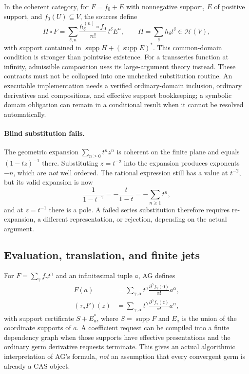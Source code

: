 \documentclass[11pt,letterpaper]{article}
\numberwithin{equation}{section}
\theoremstyle{definition}
\theoremstyle{remark}
\newcommand{\HH}{\mathscr H}
\newcommand{\supp}{\operatorname{supp}}
\begin{document}
In the coherent category, for $F=f_0+E$ with nonnegative support, $E$ of
positive support, and $f_0(U)\subseteq V$, the sources define
\begin{equation}\label{cas:eq-composition}
 H\circ F=\sum_{\delta,n}\frac{h_\delta^{(n)}\circ f_0}{n!}\,t^\delta E^n,
 \qquad H=\sum_\delta h_\delta t^\delta\in\HH(V),
\end{equation}
with support contained in $\supp H+(\supp E)^*$. This common-domain condition is
stronger than pointwise existence. For a transseries function at infinity,
admissible composition uses its large-argument theory instead. These contracts
must not be collapsed into one unchecked substitution routine. An executable
implementation needs a verified ordinary-domain inclusion, ordinary derivatives
and compositions, and effective support bookkeeping; a symbolic domain
obligation can remain in a conditional result when it cannot be resolved
automatically.

\paragraph{Blind substitution fails.}
The geometric expansion $\sum_{n\ge0}t^nz^n$ is coherent on the finite plane and
equals $(1-tz)^{-1}$ there. Substituting $z=t^{-2}$ into the expansion produces
exponents $-n$, which are \emph{not} well ordered. The rational expression still
has a value at $t^{-2}$, but its valid expansion is now
\begin{equation}\label{cas:eq-blindsub}
 \frac1{1-t^{-1}}=-\frac{t}{1-t}=-\sum_{n\ge1}t^n ,
\end{equation}
and at $z=t^{-1}$ there is a pole. A failed series substitution therefore
requires re-expansion, a different representation, or rejection, depending on
the actual argument.

\subsection{Evaluation, translation, and finite jets}
\label{cas:sub-jetsgerms}
For $F=\sum_\gamma f_\gamma t^\gamma$ and an infinitesimal tuple $a$, AG defines
\begin{align}
 F(a)&=\sum_{\gamma,\alpha}t^\gamma
 \frac{\partial^\alpha f_\gamma(0)}{\alpha!}a^\alpha,
 \label{cas:eq-germeval}\\
 (\tau_aF)(z)&=\sum_{\gamma,\alpha}t^\gamma
 \frac{\partial^\alpha f_\gamma(z)}{\alpha!}a^\alpha,
 \label{cas:eq-germtranslation}
\end{align}
with support certificate $S+E_a^*$, where $S=\supp F$ and $E_a$ is the union of
the coordinate supports of $a$. A coefficient request can be compiled into a
finite dependency graph when those supports have effective presentations and the
ordinary germ derivative requests terminate. This gives an actual algorithmic
interpretation of AG's formula, \emph{not} an assumption that every convergent
germ is already a CAS object.
\end{document}
